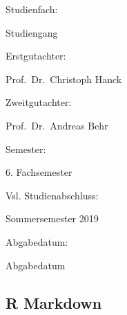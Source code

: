 \documentclass[11pt,]{article}
\begin{document}
\begin{titlepage}
  \noindent\begin{minipage}[t]{0.3\textwidth}
  Studienfach:
  \end{minipage}
  \begin{minipage}[t]{0.7\textwidth}
  \hspace{1cm}Studiengang
  \end{minipage}   
 
  \noindent\begin{minipage}[t]{0.3\textwidth}
  Erstgutachter:
  \end{minipage}
  \begin{minipage}[t]{0.7\textwidth}
  \hspace{1cm}Prof.~Dr.~Christoph Hanck
  \end{minipage}
  
  \noindent\begin{minipage}[t]{0.3\textwidth}
  Zweitgutachter:
  \end{minipage}
  \begin{minipage}[t]{0.7\textwidth}
  \hspace{1cm}Prof.~Dr.~Andreas Behr
  \end{minipage} 
  
  \noindent\begin{minipage}[t]{0.3\textwidth}
  Semester:
  \end{minipage}
  \begin{minipage}[t]{0.7\textwidth}
  \hspace{1cm}6. Fachsemester
  \end{minipage} 
  
  \noindent\begin{minipage}[t]{0.3\textwidth}
  Vsl. Studienabschluss:
  \end{minipage}
  \begin{minipage}[t]{0.7\textwidth}
  \hspace{1cm}Sommersemester 2019
  \end{minipage} 
  
  \noindent\begin{minipage}[t]{0.3\textwidth}
  Abgabedatum:
  \end{minipage}
  \begin{minipage}[t]{0.7\textwidth}
  \hspace{1cm}Abgabedatum
  \end{minipage}
     
\end{titlepage}


{
\hypersetup{linkcolor=black}
\setcounter{tocdepth}{3}
\tableofcontents
}
\newpage
\listoftables
\newpage
\listoffigures
\newpage
{} 
\hypertarget{r-markdown}{%
\subsection{R Markdown}\label{r-markdown}}
\end{document}
